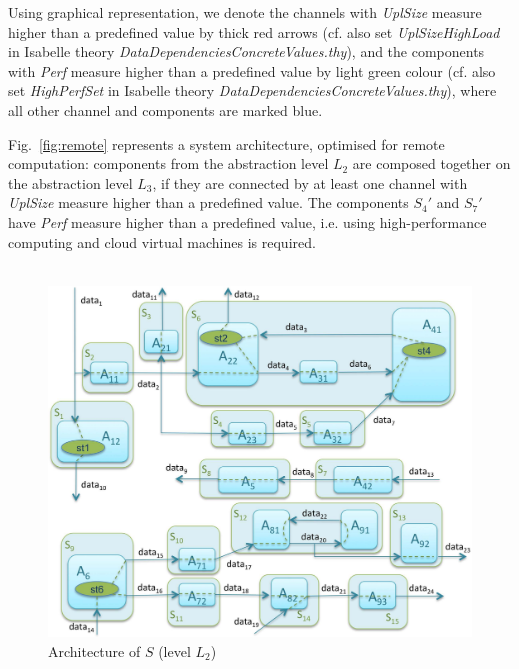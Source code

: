 \newpage
Using graphical representation, we denote the channels with \emph{UplSize} measure higher than a predefined value by thick red arrows (cf. also set \emph{UplSizeHighLoad} in
Isabelle theory \emph{DataDependenciesConcreteValues.thy}), and 
the components with  \emph{Perf} measure higher than a predefined value by   light green colour (cf. also set \emph{HighPerfSet} in
Isabelle theory \emph{DataDependenciesConcreteValues.thy}), 
where all other channel and components are marked  blue. 

Fig.~\ref{fig:remote} represents a system architecture, optimised for remote computation:
components from the abstraction level $L_{2}$ are composed together on the abstraction level $L_{3}$, if they are connected by at least one channel
 with \emph{UplSize} measure higher than a predefined value. 
The components $S_{4}'$ and $S_{7}'$ have  \emph{Perf} measure higher than a predefined value, i.e. using high-performance computing and cloud virtual machines is required.
\\
~
 
\begin{figure}[ht!]
  \begin{center}
   \includegraphics[scale=0.15]{fig/L2a.pdf}
    \caption{%
    Architecture of $S$ (level $L_{2}$)}
    \label{fig:L2a}
  \end{center}
\end{figure}
 

 

